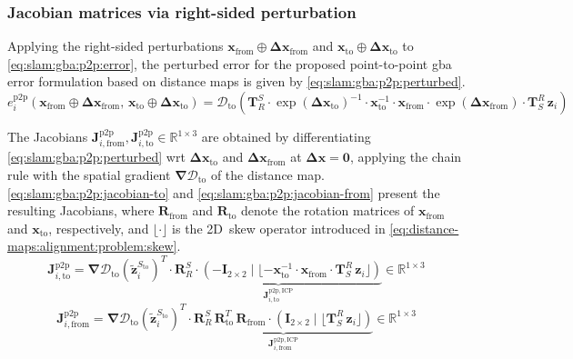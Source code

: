 \subsubsection{Jacobian matrices via right-sided perturbation}
\label{sec:slam:gba:p2p:jacobian}

Applying the right-sided perturbations
$\mathbf{x}_{\mathrm{from}}\oplus\mathbf{\Delta x}_{\mathrm{from}}$ and
$\mathbf{x}_{\mathrm{to}}\oplus\mathbf{\Delta x}_{\mathrm{to}}$ to
\eqref{eq:slam:gba:p2p:error}, the perturbed error for the proposed
point-to-point \gls{gba} error formulation based on distance maps is given by
\eqref{eq:slam:gba:p2p:perturbed}.
\begin{equation}
\label{eq:slam:gba:p2p:perturbed}
e_i^{\mathrm{p2p}}\!\left(\mathbf{x}_{\mathrm{from}}\oplus\mathbf{\Delta x}_{\mathrm{from}},\,
                          \mathbf{x}_{\mathrm{to}}\oplus\mathbf{\Delta x}_{\mathrm{to}}\right) =
\mathcal{D}_{\mathrm{to}}\!\left(
  \mathbf{T}_R^S\cdot
  \exp(\mathbf{\Delta x}_{\mathrm{to}})^{-1}\cdot
  \mathbf{x}_{\mathrm{to}}^{-1}\cdot
  \mathbf{x}_{\mathrm{from}}\cdot
  \exp(\mathbf{\Delta x}_{\mathrm{from}})\cdot
  \mathbf{T}_S^R\,\mathbf{z}_i
\right)
\end{equation}

The Jacobians $\mathbf{J}_{i,\mathrm{from}}^{\mathrm{p2p}},
\mathbf{J}_{i,\mathrm{to}}^{\mathrm{p2p}}\in\mathbb{R}^{1\times3}$ are
obtained by differentiating \eqref{eq:slam:gba:p2p:perturbed} \gls{wrt}
$\mathbf{\Delta x}_{\mathrm{to}}$ and $\mathbf{\Delta x}_{\mathrm{from}}$ at
$\mathbf{\Delta x}=\mathbf{0}$, applying the chain rule with the spatial
gradient $\bm{\nabla}\mathcal{D}_{\mathrm{to}}$ of the distance map.
\eqref{eq:slam:gba:p2p:jacobian-to} and
\eqref{eq:slam:gba:p2p:jacobian-from} present the resulting Jacobians,
where $\mathbf{R}_{\mathrm{from}}$ and $\mathbf{R}_{\mathrm{to}}$
denote the rotation matrices of $\mathbf{x}_{\mathrm{from}}$ and
$\mathbf{x}_{\mathrm{to}}$, respectively, and
$\lfloor\cdot\rfloor$ is the 2D~skew operator introduced in
\eqref{eq:distance-maps:alignment:problem:skew}.
\begin{equation}
\label{eq:slam:gba:p2p:jacobian-to}
\mathbf{J}_{i,\mathrm{to}}^{\mathrm{p2p}} =
\bm{\nabla}\mathcal{D}_{\mathrm{to}}\!\left(\tilde{\mathbf{z}}_i^{S_{\mathrm{to}}}\right)^T
\cdot
\underbrace{
  \mathbf{R}_R^S \cdot
  \left(-\mathbf{I}_{2\times2}\;\big|\;
    \lfloor -\mathbf{x}_{\mathrm{to}}^{-1}\cdot
          \mathbf{x}_{\mathrm{from}}\cdot
          \mathbf{T}_S^R\,\mathbf{z}_i
    \rfloor
  \right)}_{\mathbf{J}_{i,\mathrm{to}}^{\mathrm{p2p,ICP}}}
\in\mathbb{R}^{1\times3}
\end{equation}
\begin{equation}
\label{eq:slam:gba:p2p:jacobian-from}
\mathbf{J}_{i,\mathrm{from}}^{\mathrm{p2p}} =
\bm{\nabla}\mathcal{D}_{\mathrm{to}}\!\left(\tilde{\mathbf{z}}_i^{S_{\mathrm{to}}}\right)^T \cdot
\underbrace{
  \mathbf{R}_R^S\,\mathbf{R}_{\mathrm{to}}^T\,\mathbf{R}_{\mathrm{from}} \cdot
  \left(\mathbf{I}_{2\times2}\;\big|\;
    \lfloor \mathbf{T}_S^R\,\mathbf{z}_i\rfloor
  \right)}_{\mathbf{J}_{i,\mathrm{from}}^{\mathrm{p2p,ICP}}}
\in\mathbb{R}^{1\times3}
\end{equation}


